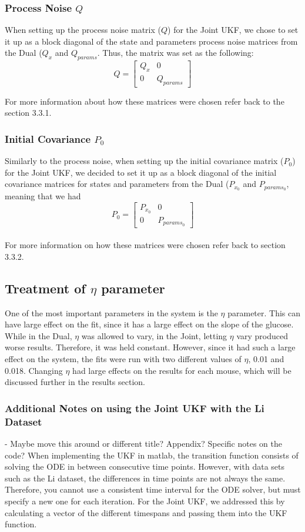 \subsubsection{Process Noise $Q$}
When setting up the process noise matrix ($Q$) for the Joint UKF, we chose to set it up as a block diagonal of the state and parameters process noise matrices from the Dual ($Q_x$ and $Q_{params}$. Thus, the matrix was set as the following:\\
$$Q = \begin{bmatrix} Q_x & 0 \\ 0 & Q_{params} \end{bmatrix}$$

For more information about how these matrices were chosen refer back to the section 3.3.1.

\subsubsection{Initial Covariance $P_0$}
Similarly to the process noise, when setting up the initial covariance matrix ($P_0$) for the Joint UKF, we decided to set it up as a block diagonal of the initial covariance matrices for states and parameters from the Dual ($P_{x_0}$ and $P_{params_0}$, meaning that we had\\
$$P_0 = \begin{bmatrix} P_{x_0} & 0 \\ 0 & P_{params_0} \end{bmatrix}$$\\
For more information on how these matrices were chosen refer back to section 3.3.2. 

\subsection{Treatment of $\eta$ parameter}
One of the most important parameters in the system is the $\eta$ parameter. This can have large effect on the fit, since it has a large effect on the slope of the glucose. While in the Dual, $\eta$ was allowed to vary, in the Joint, letting $\eta$ vary produced worse results. Therefore, it was held constant. However, since it had such a large effect on the system, the fits were run with two different values of $\eta$, 0.01 and 0.018. Changing $\eta$ had large effects on the results for each mouse, which will be discussed further in the results section. 

\subsubsection{Additional Notes on using the Joint UKF with the Li Dataset} - Maybe move this around or different title? Appendix? Specific notes on the code?
When implementing the UKF in matlab, the transition function consists of solving the ODE in between consecutive time points. However, with data sets such as the Li dataset, the differences in time points are not always the same. Therefore, you cannot use a consistent time interval for the ODE solver, but must specify a new one for each iteration. For the Joint UKF, we addressed this by calculating a vector of the different timespans and passing them into the UKF function. 

